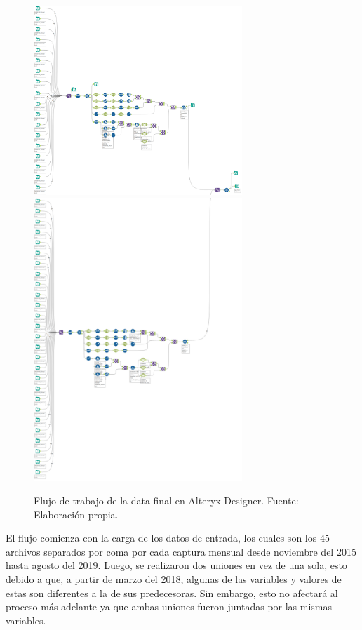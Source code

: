 \begin{figure}[htbp]
	\begin{center}
		\includegraphics[width=0.7\textwidth]{4/figures/alteryx_flux_part1.png}	
		\includegraphics[width=0.7\textwidth]{4/figures/alteryx_flux_part2.png}
		\caption{Flujo de trabajo de la data final en Alteryx Designer. Fuente: Elaboración propia.}
		\label{4:fig4}
	\end{center}
\end{figure}

El flujo comienza con la carga de los datos de entrada, los cuales son los 45 archivos separados por coma por cada captura mensual desde noviembre del 2015 hasta agosto del 2019. Luego, se realizaron dos uniones en vez de una sola, esto debido a que, a partir de marzo del 2018, algunas de las variables y valores de estas son diferentes a la de sus predecesoras. Sin embargo, esto no afectará al proceso más adelante ya que ambas uniones fueron juntadas por las mismas variables.


